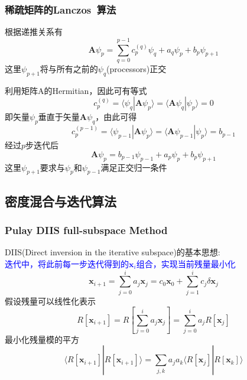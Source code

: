 \documentclass[cjk,slidestop,compress,mathserif,blue]{beamer}
\begin{document}
\frame
{
	\frametitle{稀疏矩阵的\textrm{Lanczos~}算法}
	根据递推关系有
	\begin{displaymath}
		\mathbf{A}\psi_p=\sum_{q=0}^{p-1}c_p^{(q)}\psi_q+a_q\psi_p+b_p\psi_{p+1}
	\end{displaymath}
	这里$\psi_{p+1}$将与所有之前的$\psi_q$(\textrm{processors})正交

	利用矩阵$\mathrm{A}$的\textrm{Hermitian}，因此可有等式
	\begin{displaymath}
		c_p^{(q)}=\langle\psi_q|\mathbf{A}\psi_p\rangle=\langle\mathbf{A}\psi_q|\psi_p\rangle=0
	\end{displaymath}
	即矢量$\psi_p$垂直于矢量$\mathbf{A}\psi_q$，由此可得
	\begin{displaymath}
		c_p^{(p-1)}=\langle\psi_{p-1}|\mathbf{A}\psi_p\rangle=\langle\mathbf{A}\psi_{p-1}|\psi_p\rangle=b_{p-1}
	\end{displaymath}
	经过$p$步迭代后
	\begin{displaymath}
		\mathbf{A}\psi_p=b_{p-1}\psi_{p-1}+a_p\psi_p+b_p\psi_{p+1}
	\end{displaymath}
	这里$\psi_{p+1}$要求与$\psi_p$和$\psi_{p-1}$满足正交归一条件
}

\subsection{密度混合与迭代算法}
\frame
{
	\frametitle{\textrm{Pulay DIIS full-subspace Method}}
	\textrm{DIIS(Direct inversion in the iterative subspace)}的基本思想:~\\
	\textcolor{blue}{迭代中，将此前每一步迭代得到的$\mathbf{x}_i$组合，实现当前残量最小化}
	\begin{displaymath}
		\mathbf{x}_{i+1}=\sum_{j=0}^ia_j\mathbf{x}_{j}=c_0\mathbf{x}_0+\sum_{j=1}^ic_j\delta\mathbf{x}_{j}
	\end{displaymath}
	假设残量可以线性化表示
	\begin{displaymath}
		R[\mathbf{x}_{i+1}]=R[\sum_{j=0}^ia_j\mathbf{x}_{j}]=\sum_{j=0}^ia_jR[\mathbf{x}_{j}]
	\end{displaymath}
	最小化残量模的平方
	\begin{displaymath}
		\langle R[\mathbf{x}_{i+1}]|R[\mathbf{x}_{i+1}]\rangle=\sum_{j,k}a_ja_k\langle R[\mathbf{x}_{j}]|R[\mathbf{x}_{k}]\rangle
	\end{displaymath}
}
\end{document}
